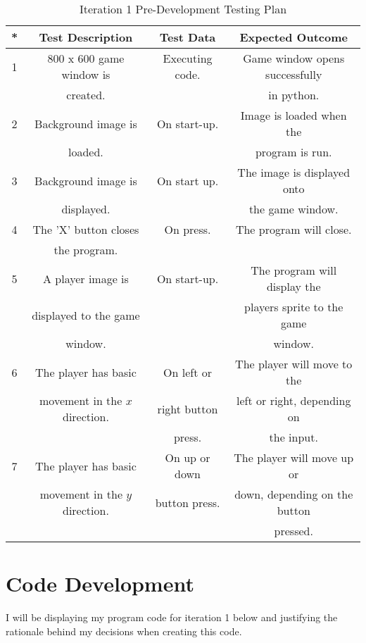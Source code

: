 \documentclass[12pt]{report}
\begin{document}
\begin{table}[H]
    \centering
    \begin{tabular}{|c|c|c|c|}
    \hline
    \textbf{*} & \textbf{Test Description} & \textbf{Test Data} & \textbf{Expected Outcome}\\
    \hline
    1 & 800 x 600 game window is & Executing code. & Game window opens successfully\\
    & created. & & in python.\\
    \hline
    2 & Background image is & On start-up. & Image is loaded when the\\
      & loaded.              &             & program is run. \\
    \hline
    3 & Background image is & On start up. & The image is displayed onto\\
    & displayed. & & the game window. \\
    \hline
    4 & The 'X' button closes & On press. & The program will close.\\
    & the program. & & \\
    \hline
    5 & A player image is & On start-up. & The program will display the \\
    & displayed to the game & & players sprite to the game \\
    & window. & & window.\\
    \hline
    6 & The player has basic & On left or & The player will move to the\\
    & movement in the $x$ direction. & right button & left or right, depending on \\
    & & press. & the input.\\
    \hline
    7 & The player has basic & On up or down & The player will move up or\\
    & movement in the $y$ direction. & button press. & down, depending on the button\\
    & & & pressed. \\
    \hline
    \end{tabular}
    \caption{Iteration 1 Pre-Development Testing Plan}
    \label{TestTable}
\end{table}

\pagebreak

\section{Code Development}
I will be displaying my program code for iteration 1 below and justifying the rationale behind my decisions when creating this code.
\end{document}
